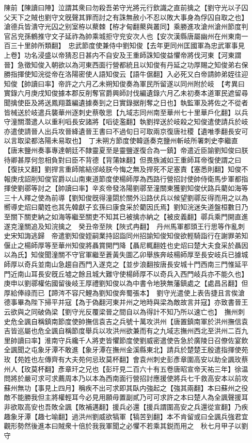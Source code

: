 陳前【陳讀曰陣】泣謂其衆曰勿殺吾弟守光將元行欽識之直前擒之【劉守光以子囚父天下之賊也劉守文旣聲其罪而討之有誅無赦小不忍以敗大事身為俘囚自取之也】滄德兵皆潰守光囚之别室栫以藂棘【栫才甸翻藂與叢同】乘勝進攻滄州滄州節度判官呂兖孫鶴推守文子延祚為帥乘城拒守兖安次人也【安次漢縣唐屬幽州在州東南一百三十里帥所類翻】　忠武節度使兼侍中劉知俊【去年更同州匡國軍為忠武軍事見上卷】功名浸盛以帝猜忍日甚内不自安及王重師誅知俊益懼帝將伐河東【河東謂晉】急徵知俊入朝欲以為河東西面行營都統且以知俊有丹延之功厚賜之知俊弟右保勝指揮使知浣從帝在洛陽密使人語知俊云【語牛倨翻】入必死又白帝請帥弟姪往迎知俊【帥讀曰率】帝許之六月乙未朔知俊奏為軍民所留遂以同州附於岐　【考異曰實錄六月庚戌知俊據本郡反削奪官爵興師討伐編遺錄六月乙未初奏本道軍民遮留尋聞擒使臣及將送鳳翔蓋編遺據奏到之日實錄据削奪之日也】執監軍及將佐之不從者皆械送於岐遣兵襲華州逐刺史蔡敬思【九域志同州南至華州七十里華戶化翻】以兵守潼關濳遣人以重利㗖長安諸將【㗖徒濫翻】執劉捍送於岐殺之知俊遣使請兵於岐亦遣使請晉人出兵攻晉絳遺晉王書曰不過旬日可取兩京復唐社稷【遺唯季翻長安可以言取梁都洛陽未易取也】　丁未朔方節度使韓遜奏克鹽州斬岐所署刺史李繼直【唐末鹽州奏事專達朝廷不隸靈夏至是靈鹽遂復合為一鎮】帝遣近臣諭劉知俊曰朕待卿甚厚何忽相負對曰臣不背德【背蒲妹翻】但畏族滅如王重師耳帝復使謂之曰【復扶又翻】劉捍言重師隂結邠岐朕今悔之無及捍死不足塞責【塞悉則翻】知俊不報庚戌詔削知俊官爵以山南東道節度使楊師厚為西路行營招討使帥侍衛馬步軍都指揮使劉鄩等討之【帥讀曰率】辛亥帝發洛陽劉鄩至潼關東獲劉知俊伏路兵藺如海等三十人釋之使為前導【劉知俊旣得潼閟於關外沿路伏兵以候望劉鄩反得而用之以為嚮導史炤曰藺姓也其先韓獻子玄孫曰康食采於藺因氏焉】劉知浣迷失道盤桓數日乃至關下關吏納之如海等繼至關吏不知其已被擒亦納之【被皮義翻】鄩兵乘門開直進遂克潼關追及知浣擒之　癸丑帝至陜【陜式冉翻】　丹州馬軍都頭王行思等作亂刺史宋知誨逃歸　帝遣劉知俊姪嗣業持詔詣同州招諭知俊知俊欲輕騎詣行在謝罪弟知偃止之楊師厚等至華州知俊將聶賞開門降【聶尼輒翻姓也史炤曰楚大夫食采於聶因以為氏】知俊聞潼關不守官軍繼至蒼黃失圖乙卯舉族奔岐楊師厚至長安岐兵已據城師厚以奇兵並南山急趨自西門入遂克之【並步浪翻按唐長安城十門西南三門惟延平門近南山耳長安旣丘墟之餘且城大難守使楊師厚不以奇兵入西門岐兵亦不能久也】庚申以劉鄩權佑國留後岐王厚禮劉知俊以為中書令地狹無藩鎮處之【處昌呂翻】但厚給俸祿而已【蹄涔不容尺鯉為劉知俊奔蜀張本】　劉守光遣使上表告捷且言俟滄德事畢為陛下掃平并寇【為于偽翻河東并州之地時與梁為敵故言并寇】亦致書晉王云欲與之同破偽梁【劉守光反覆梁晉之間自以為得計不知乃所以速亡也】　撫州刺史危全諷自稱鎮南節度使帥撫信袁吉之兵號十萬攻洪州【唐置鎮南軍於洪州撫信袁吉皆巡屬也危全諷自稱節度舉兵以攻洪州欲兼而有之九域志撫州西北至洪州二百九里帥讀曰率】淮南守兵纔千人將吏皆懼節度使劉威密遣使告急於廣陵日召僚佐宴飲全諷聞之屯象牙潭不敢進【象牙潭在撫州金溪縣東北】請兵於楚楚王殷遣指揮使苑玫【苑姓也左傳齊有大夫苑何忌玫莫杯翻】會袁州刺史彭彥章圍高安以助全諷玫蔡州人【玫莫杯翻】彥章玕之兄也【彭玕見二百六十有五卷唐昭宣帝天祐三年】徐温問將於嚴可求可求薦周本乃以本為西南面行營招討應援使將兵七千救高安本以前攻蘇州無功【事見上四月】稱疾不出可求即其臥内強起之【強其兩翻】本曰蘇州之役敵不能勝我但主將權輕耳今必見用願毋置副貳乃可可求許之本曰楚人為全諷聲援耳非欲取高安也吾敗全諷【敗補邁翻】援兵必還【援兵謂圍高安之兵還從宣翻】乃疾趣象牙潭【趣七喻翻】過洪州劉威欲犒軍【犒苦到翻】本不肯留或曰全諷兵強君宜觀形勢然後進本曰賊衆十倍於我我軍聞之必懼不若乘其鋭而用之　秋七月甲子以劉守